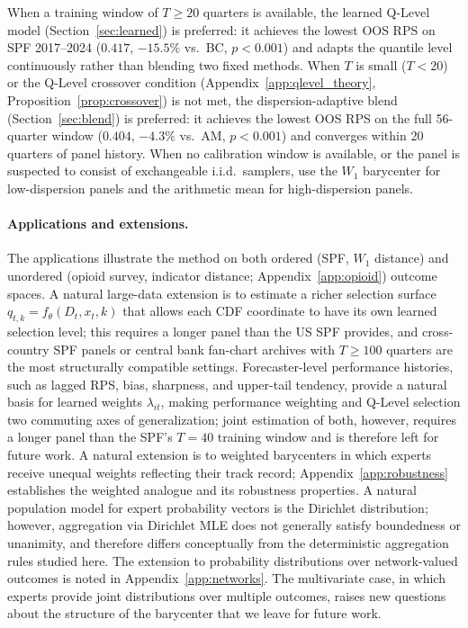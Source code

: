 \begin{remark}
When a training window of $T\geq20$ quarters is available, the learned Q-Level model (Section~\ref{sec:learned}) is preferred: it achieves the lowest OOS RPS on SPF 2017--2024 ($0.417$, $-15.5\%$ vs.\ BC, $p < 0.001$) and adapts the quantile level continuously rather than blending two fixed methods.  When $T$ is small ($T < 20$) or the Q-Level crossover condition (Appendix~\ref{app:qlevel_theory}, Proposition~\ref{prop:crossover}) is not met, the dispersion-adaptive blend (Section~\ref{sec:blend}) is preferred: it achieves the lowest OOS RPS on the full 56-quarter window ($0.404$, $-4.3\%$ vs.\ AM, $p < 0.001$) and converges within 20 quarters of panel history.  When no calibration window is available, or the panel is suspected to consist of exchangeable i.i.d.\ samplers, use the $W_1$ barycenter for low-dispersion panels and the arithmetic mean for high-dispersion panels.
\end{remark}

\paragraph{Applications and extensions.}  The applications illustrate the method on both ordered (SPF, $W_1$ distance) and unordered (opioid survey, indicator distance; Appendix~\ref{app:opioid}) outcome spaces.  A natural large-data extension is to estimate a richer selection surface $q_{t,k} = f_\theta(D_t, x_t, k)$ that allows each CDF coordinate to have its own learned selection level; this requires a longer panel than the US SPF provides, and cross-country SPF panels or central bank fan-chart archives with $T \geq 100$ quarters are the most structurally compatible settings.
Forecaster-level performance histories, such as lagged RPS, bias, sharpness, and upper-tail tendency, provide a natural basis for learned weights $\lambda_{it}$, making performance weighting and Q-Level selection two commuting axes of generalization; joint estimation of both, however, requires a longer panel than the SPF's $T=40$ training window and is therefore left for future work.  A natural extension is to weighted barycenters in which experts receive unequal weights reflecting their track record; Appendix~\ref{app:robustness} establishes the weighted analogue and its robustness properties.  A natural population model for expert probability vectors is the Dirichlet distribution; however, aggregation via Dirichlet MLE does not generally satisfy boundedness or unanimity, and therefore differs conceptually from the deterministic aggregation rules studied here.  The extension to probability distributions over network-valued outcomes is noted in Appendix~\ref{app:networks}.  The multivariate case, in which experts provide joint distributions over multiple outcomes, raises new questions about the structure of the barycenter that we leave for future work.

